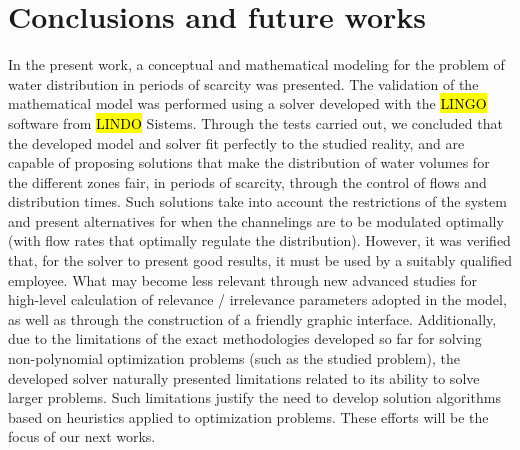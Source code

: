 \documentclass{singlecol}
\theoremstyle{TH}{
\newtheorem{lemma}{Lemma}
\newtheorem{theorem}[lemma]{Theorem}
\newtheorem{corrolary}[lemma]{Corrolary}
\newtheorem{conjecture}[lemma]{Conjecture}
\newtheorem{proposition}[lemma]{Proposition}
\newtheorem{claim}[lemma]{Claim}
\newtheorem{stheorem}[lemma]{Wrong Theorem}
\newtheorem{algorithm}{Algorithm}
}
\theoremstyle{THrm}{
\newtheorem{definition}{Definition}[section]
\newtheorem{question}{Question}[section]
\newtheorem{remark}{Remark}
\newtheorem{scheme}{Scheme}
}
\theoremstyle{THhit}{
\newtheorem{case}{Case}[section]
}
\begin{document}
\section{Conclusions and future works}
\label{sec:conclusions}

In the present work, a conceptual and mathematical modeling for the problem of water distribution in periods of scarcity was presented. The validation of the mathematical model was performed using a solver developed with the \hl{LINGO} software from \hl{LINDO} Sistems. Through the tests carried out, we concluded that the developed model and solver fit perfectly to the studied reality, and are capable of proposing solutions that make the distribution of water volumes for the different zones fair, in periods of scarcity, through the control of flows and distribution times. Such solutions take into account the restrictions of the system and present alternatives for when the channelings are to be modulated optimally (with flow rates that optimally regulate the distribution). However, it was verified that, for the solver to present good results, it must be used by a suitably qualified employee. What may become less relevant through new advanced studies for high-level calculation of relevance / irrelevance parameters adopted in the model, as well as through the construction of a friendly graphic interface.  Additionally, due to the limitations of the exact methodologies developed so far for solving non-polynomial optimization problems (such as the studied problem), the developed solver naturally presented limitations related to its ability to solve larger problems. Such limitations justify the need to develop solution algorithms based on heuristics applied to optimization problems. These efforts will be the focus of our next works.


\end{document}
